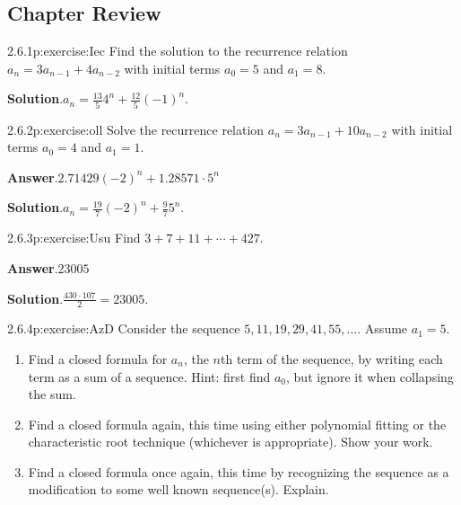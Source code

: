 \documentclass[twoside,11pt,]{book}
\newcommand{\blocktitlefont}{\relax}
\numberwithin{equation}{chapter}
\begin{document}
\subsection*{Chapter Review}
\begin{divisionsolution}{2.6.1}{}{p:exercise:Iec}%
Find the solution to the recurrence relation \(a_n = 3a_{n-1} + 4a_{n-2}\) with initial terms \(a_0 = 5\) and \(a_1 = 8\text{.}\)%
\par\smallskip%
\noindent\textbf{\blocktitlefont Solution}.\quad{}\(a_n = \frac{13}{5} 4^n + \frac{12}{5} (-1)^n\text{.}\)%
\end{divisionsolution}%
\begin{divisionsolution}{2.6.2}{}{p:exercise:oll}%
Solve the recurrence relation \(a_n = 3a_{n-1} + 10a_{n-2}\) with initial terms \(a_0 = 4\) and \(a_1 = 1\text{.}\)%
\par\smallskip%
\noindent\textbf{\blocktitlefont Answer}.\quad{}\(2.71429\!\left(-2\right)^{n}+1.28571\cdot 5^{n}\)%
\par\smallskip%
\noindent\textbf{\blocktitlefont Solution}.\quad{}\(a_n = \frac{19}{7}(-2)^n + \frac{9}{7}5^n\text{.}\)%
\end{divisionsolution}%
\begin{divisionsolution}{2.6.3}{}{p:exercise:Usu}%
Find \(3 + 7 + 11+ \cdots + 427\text{.}\)%
\par\smallskip%
\noindent\textbf{\blocktitlefont Answer}.\quad{}\(23005\)%
\par\smallskip%
\noindent\textbf{\blocktitlefont Solution}.\quad{}\(\frac{430\cdot 107}{2} = 23005\text{.}\)%
\end{divisionsolution}%
\begin{divisionsolution}{2.6.4}{}{p:exercise:AzD}%
Consider the sequence \(5, 11, 19, 29, 41, 55,\ldots\). Assume \(a_1 = 5\).%
\begin{enumerate}[label=(\alph*)]
\item{}Find a closed formula for \(a_n\), the \(n\)th term of the sequence, by writing each term as a sum of a sequence. Hint: first find \(a_0\), but ignore it when collapsing the sum. %
\item{}Find a closed formula again, this time using either polynomial fitting or the characteristic root technique (whichever is appropriate). Show your work. %
\item{}Find a closed formula once again, this time by recognizing the sequence as a modification to some well known sequence(s). Explain. %
\end{enumerate}
%
\end{divisionsolution}%
\end{document}
